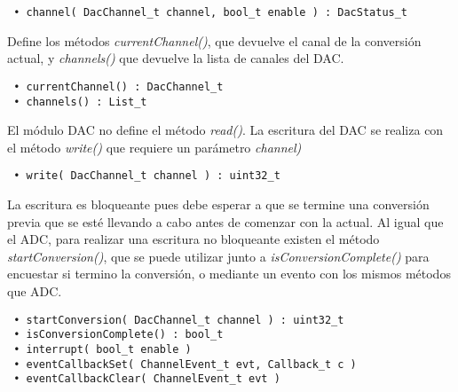 \begin{verbatim}
 • channel( DacChannel_t channel, bool_t enable ) : DacStatus_t
\end{verbatim}

Define los métodos \emph{currentChannel()}, que devuelve el canal de la conversión actual, y \emph{channels()} que devuelve la lista de canales del DAC.

\begin{verbatim}
 • currentChannel() : DacChannel_t
 • channels() : List_t
\end{verbatim}

El módulo DAC no define el método \emph{read()}. La escritura del DAC se realiza con el método \emph{write()} que requiere un parámetro \emph{channel)}

\begin{verbatim}
 • write( DacChannel_t channel ) : uint32_t
\end{verbatim}

La escritura es bloqueante pues debe esperar a que se termine una conversión previa que se esté llevando a cabo antes de comenzar con la actual. Al igual que el ADC, para realizar una escritura no bloqueante existen el método \emph{startConversion()}, que se puede utilizar junto a \emph{isConversionComplete()} para encuestar si termino la conversión, o mediante un evento con los mismos métodos que ADC.

\begin{verbatim}
 • startConversion( DacChannel_t channel ) : uint32_t
 • isConversionComplete() : bool_t
 • interrupt( bool_t enable )
 • eventCallbackSet( ChannelEvent_t evt, Callback_t c )
 • eventCallbackClear( ChannelEvent_t evt )
\end{verbatim}
